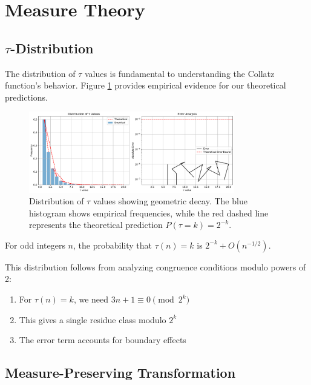 \section{Measure Theory}\label{sec:measure_theory}

\subsection{$\tau$-Distribution}

The distribution of $\tau$ values is fundamental to understanding the Collatz function's behavior. Figure \ref{fig:tau_distribution} provides empirical evidence for our theoretical predictions.

\begin{figure}[h]
\centering
\includegraphics[width=0.8\textwidth]{py_visuals/figures/tau_distribution.pdf}
\caption{Distribution of $\tau$ values showing geometric decay. The blue histogram shows empirical frequencies, while the red dashed line represents the theoretical prediction $P(\tau = k) = 2^{-k}$.}
\label{fig:tau_distribution}
\end{figure}

\begin{theorem}\label{thm:tau_dist}
For odd integers $n$, the probability that $\tau(n) = k$ is $2^{-k} + O(n^{-1/2})$.
\end{theorem}

This distribution follows from analyzing congruence conditions modulo powers of 2:
\begin{enumerate}
\item For $\tau(n) = k$, we need $3n + 1 \equiv 0 \pmod{2^k}$
\item This gives a single residue class modulo $2^k$
\item The error term accounts for boundary effects
\end{enumerate}

\subsection{Measure-Preserving Transformation}

